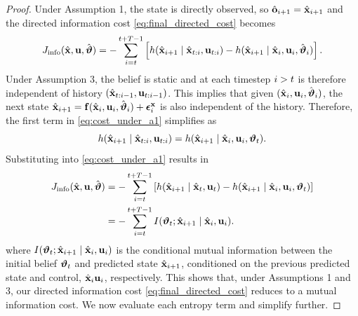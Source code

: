 \begin{proof}
Under Assumption 1,  the state is directly observed, so $\hat{\mathbf{o}}_{i+1} = \hat{\mathbf{x}}_{i+1}$ and the directed information cost \eqref{eq:final_directed_cost} becomes
\begin{equation}
    J_{\text{info}}(\hat{\mathbf{x}}, \mathbf{u}, \hat{\boldsymbol{{\vartheta}}}) = -\sum_{i=t}^{t+T-1} \left[ h(\hat{\mathbf{x}}_{i+1} \mid \hat{\mathbf{x}}_{t:i},\mathbf{u}_{t:i}) - h(\hat{\mathbf{x}}_{i+1} \mid \hat{\mathbf{x}}_i, \mathbf{u}_i, \hat{\boldsymbol{{\vartheta}}}_i)\right].
    \label{eq:cost_under_a1}
\end{equation}
Under Assumption 3, the belief is static and at each timestep $i > t$ is therefore independent of history $(\hat{\mathbf{x}}_{t:i-1}, \mathbf{u}_{t:i-1})$. 
This implies that given $(\hat{\mathbf{x}}_i, \mathbf{u}_i, \hat{\boldsymbol{{\vartheta}}}_i)$, the next state $\hat{\mathbf{x}}_{i+1} = \mathbf{f}(\hat{\mathbf{x}}_i, \mathbf{u}_i, \hat{\boldsymbol{{\vartheta}}}_i) + \boldsymbol{\epsilon}^{\mathbf{x}}_i$ is also independent of the history.
Therefore, the first term in \cref{eq:cost_under_a1} simplifies as 
\begin{equation}
    h(\hat{\mathbf{x}}_{i+1} \mid \hat{\mathbf{x}}_{t:i}, \mathbf{u}_{t:i}) = h(\hat{\mathbf{x}}_{i+1} \mid \hat{\mathbf{x}}_i, \mathbf{u}_i, \boldsymbol{{\vartheta}}_t).
    \label{eq:markov_requirement}
\end{equation}
Substituting into \cref{eq:cost_under_a1} results in 
\begin{subequations}
    \begin{align}
        J_{\text{info}}(\hat{\mathbf{x}}, \mathbf{u}, \hat{\boldsymbol{{\vartheta}}}) &= -\sum_{i=t}^{t+T-1} \left[ h(\hat{\mathbf{x}}_{i+1} \mid \hat{\mathbf{x}}_{t},\mathbf{u}_{t}) - h(\hat{\mathbf{x}}_{i+1} \mid \hat{\mathbf{x}}_i, \mathbf{u}_i, \boldsymbol{{\vartheta}}_t)\right] \label{eq:cost_as_mi}\\ &= -\sum_{i=t}^{t+T-1} I(\boldsymbol{{\vartheta}}_t; \hat{\mathbf{x}}_{i+1} \mid \hat{\mathbf{x}}_{i}, \mathbf{u}_{i}).
    \end{align}
\end{subequations}
where $I(\boldsymbol{{\vartheta}}_t; \hat{\mathbf{x}}_{i+1} \mid \hat{\mathbf{x}}_{i}, \mathbf{u}_{i})$ is the conditional mutual information between the initial belief $\boldsymbol{{\vartheta}}_t$ and predicted state $\hat{\mathbf{x}}_{i+1}$, conditioned on the previous predicted state and control, $\hat{\mathbf{x}}_{i} \mathbf{u}_{i}$, respectively.
This shows that, under Assumptions 1 and 3, our directed information cost \cref{eq:final_directed_cost} reduces to a mutual information cost.
We now evaluate each entropy term and simplify further. 


\end{proof}

